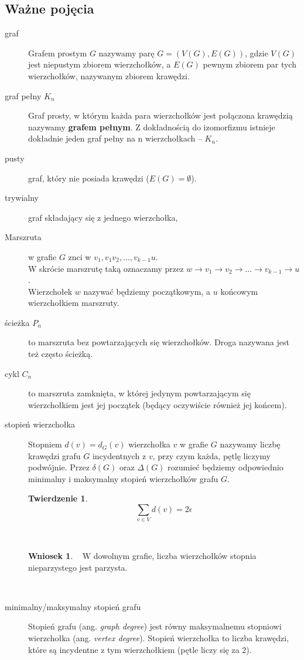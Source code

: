 \documentclass[a4paper,12pt]{article}
\theoremstyle{definition}%
\newtheorem{remark}{Wniosek}%
\newtheorem{theorem}{Twierdzenie}%
\theoremstyle{definition}
\theoremstyle{problem}
\begin{document}
\subsection{Ważne pojęcia}
\begin{description}
\item[graf] Grafem prostym $G$ nazywamy parę $G = (V (G), E(G))$, gdzie $V (G)$ jest niepustym zbiorem wierzchołków, a $E(G)$ pewnym zbiorem par tych wierzchołków, nazywanym zbiorem krawędzi.
\item[graf pełny $K_n$] Graf prosty, w którym każda para wierzchołków jest połączona krawędzią nazywamy \textbf{grafem pełnym}. Z dokładnością do izomorfizmu istnieje dokładnie jeden graf pełny na n wierzchołkach – $K_n$.
\item[pusty] graf, który nie posiada krawędzi ($E(G) = \emptyset$).
\item[trywialny] graf składający się z jednego wierzchołka,
\item[Marszruta] w grafie $G$ znci w $v_1,v_1 v_2,\ldots,v_{k-1} u$.\\
W skrócie marszrutę taką oznaczamy przez $w\to v_1\to v_2\to\ldots\to v_{k-1}\to u$.\\
Wierzchołek $w$ nazywać będziemy początkowym, a $u$ końcowym wierzchołkiem marszruty.
\item[ścieżka $P_n$] to marszruta bez powtarzających się wierzchołków. Droga nazywana jest też często ścieżką.
\item[cykl $C_n$] to marszruta zamknięta, w której jedynym powtarzającym się wierzchołkiem jest jej początek (będący oczywiście również jej końcem).
\item[stopień wierzchołka] Stopniem $d(v) = d_G(v)$ wierzchołka $v$ w grafie $G$ nazywamy liczbę krawędzi grafu $G$ incydentnych z $v$, przy czym każda, pętlę liczymy podwójnie. Przez $\delta (G)$ oraz $\Delta (G)$ rozumieć będziemy odpowiednio minimalny i maksymalny stopień wierzchołków grafu $G$.
\begin{theorem}~ %
$$\sum _{v\in V}d(v)=2\epsilon$$
\end{theorem}~ %
\begin{remark}~ %
W dowolnym grafie, liczba wierzchołków stopnia nieparzystego jest parzysta.
\end{remark}~ %
\item[minimalny/maksymalny stopień grafu] Stopień grafu (ang. \textit{graph degree}) jest równy maksymalnemu stopniowi wierzchołka (ang. \textit{vertex degree}). Stopień wierzchołka to liczba krawędzi, które są incydentne z tym wierzchołkiem (pętle liczy się za 2).\\

\end{description}
\end{document}
